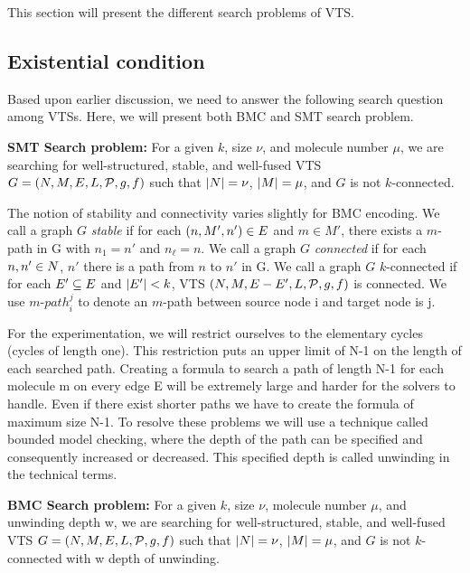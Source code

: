 This section will present the different search problems of VTS.

\subsection{Existential condition}

Based upon earlier discussion, we need to answer the following search
question among VTSs.
%
Here, we will present both BMC and SMT search problem.

\textbf{SMT Search problem:}
For a given $k$, size $\nu$, and molecule number $\mu$,
we are searching for well-structured, stable, and well-fused VTS
$G = (N,M,E,L,\mathcal{P},g,f)$ such that
$|N| = \nu$, $|M| = \mu$, and
$G$ is not $k$-connected.    

\noindent
The notion of stability and connectivity varies slightly for BMC encoding. 
%
We call a graph $G$ {\em stable} if for each $(n,M',n') \in E$ and $m \in M'$,
there exists a $m$-path in G with $n_1 = n'$ and $n_\ell = n$.
%
%
We call a graph $G$ {\em connected} if for each $n,n' \in N$,
$n'$ there is a path from $n$ to $n'$ in G.
%
We call a graph $G$ $k$-connected if for each $E' \subseteq E$ and $|E'| < k$,
VTS $(N,M,E-E',L,\mathcal{P},g,f)$ is connected.
%	
We use $m$-${path}_i^j$ to denote an $m$-path between source node i and target node is j. 

For the experimentation, we will restrict ourselves to the elementary cycles (cycles of length one). 
%
This restriction puts an upper limit of N-1 on the length of each searched path. 
%
Creating a formula to search a path of length N-1 for each molecule m on every edge E will be extremely large and harder for the solvers to handle.  
%
Even if there exist shorter paths we have to create the formula of maximum size N-1. 
% 
To resolve these problems we will use a technique called bounded model checking, where the depth of the path can be specified and consequently increased or decreased.  
%
This specified depth is called unwinding in the technical terms.

\textbf{BMC Search problem:}
For a given $k$, size $\nu$, molecule number $\mu$, and unwinding depth w,
we are searching for well-structured, stable, and well-fused VTS
$G = (N,M,E,L,\mathcal{P},g,f)$ such that
$|N| = \nu$, $|M| = \mu$, and $G$ is not $k$-connected with w depth of unwinding.    

